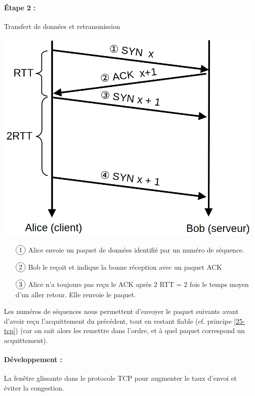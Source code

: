 \paragraph{Étape 2 :} Transfert de données et retransmission\\
\begin{minipage}{0.4\linewidth}
	\includegraphics[width=\linewidth]{lecon/25-client-serveur/transfert-tcp.png}
\end{minipage} \quad \begin{minipage}{0.55\linewidth}
	\begin{itemize}
		\item[$\circled{1}$] Alice envoie un paquet de données identifié par un numéro de séquence.
		\item[$\circled{2}$] Bob le reçoit et indique la bonne réception avec un paquet ACK
		\item[$\circled{3}$] Alice n'a toujours pas reçu le ACK après 2 RTT = 2 fois le temps moyen d'un aller retour. Elle renvoie le paquet.
	\end{itemize}
\end{minipage}

\begin{rem}
	Les numéros de séquences nous permettent d'envoyer le paquet suivants avant d'avoir reçu l'acquittement du précédent, tout en restant fiable (cf. principe \ref{25-tcp}) (car on sait alors les remettre dans l'ordre, et à quel paquet correspond un acquittement).
\end{rem}

\paragraph{Développement :} La fenêtre glissante dans le protocole TCP pour augmenter le taux d'envoi et éviter la congestion.


